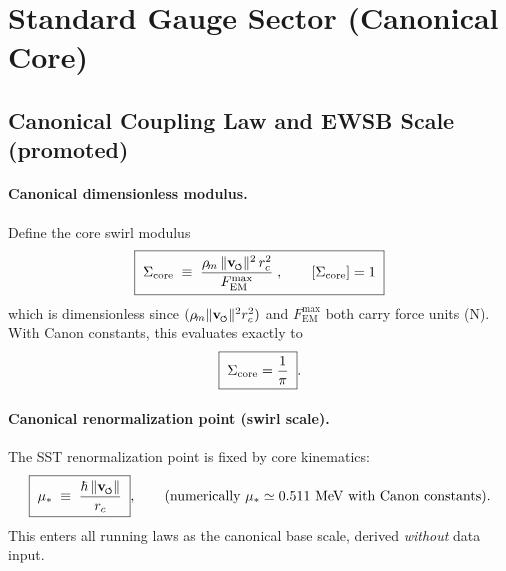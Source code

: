 \documentclass[11pt]{article}
\newcommand{\swirlarrow}{%
     \mathchoice{\mkern-2mu\scriptstyle\boldsymbol{\circlearrowleft}}%
                {\mkern-2mu\scriptstyle\boldsymbol{\circlearrowleft}}%
                {\mkern-2mu\scriptscriptstyle\boldsymbol{\circlearrowleft}}%
                {\mkern-2mu\scriptscriptstyle\boldsymbol{\circlearrowleft}}%
}
\newcommand{\vswirl}{\mathbf{v}_{\swirlarrow}}
\newcommand{\vnorm}{\lVert \vswirl \rVert}               %
\newcommand{\rhom}{\rho_{\!m}}                           %
\newcommand{\rc}{r_c}                                    %
\newcommand{\FmaxEM}{F_{\mathrm{EM}}^{\max}}             %
\begin{document}
\section{Standard Gauge Sector (Canonical Core)}
\label{sec:gauge_core}

\subsection*{Canonical Coupling Law and EWSB Scale (promoted)}

    \paragraph{Canonical dimensionless modulus.}
        Define the core swirl modulus
        \[
            \boxed{\;
            \Sigma_{\rm core}\;\equiv\;
            \frac{\rhom\,\vnorm^2\,\rc^2}{\FmaxEM}\;,\qquad [\Sigma_{\rm core}]=1
            \;}
        \]
        which is dimensionless since $(\rhom\vnorm^2\rc^2)$ and $\FmaxEM$ both carry force units (N).
        With Canon constants, this evaluates exactly to
        \[
            \boxed{\;\Sigma_{\rm core}=\frac{1}{\pi}\;}.
        \]

    \paragraph{Canonical renormalization point (swirl scale).}
        The SST renormalization point is fixed by core kinematics:
        \[
            \boxed{\;\mu_\ast \;\equiv\; \frac{\hbar\,\vnorm}{\rc}\;},\qquad
            \text{(numerically $\mu_\ast\simeq 0.511~\mathrm{MeV}$ with Canon constants).}
        \]
        This enters all running laws as the canonical base scale, derived \emph{without} data input.
\end{document}
